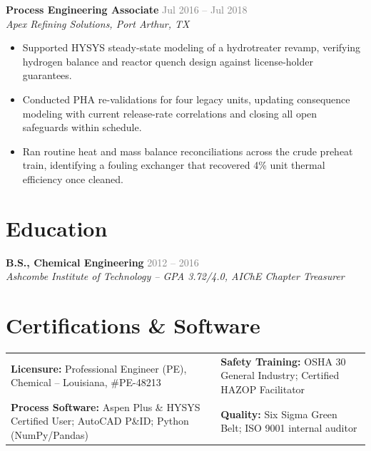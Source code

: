 \documentclass[10.5pt,letterpaper]{article}
\newcommand{\role}[3]{%
  \textbf{\color{primary}#1} \hfill \textcolor{graytext}{\small #2}\\
  \textit{\color{accent}\small #3}\par\vspace{2pt}
}
\newcommand{\edu}[3]{%
  \textbf{\color{primary}#1} \hfill \textcolor{graytext}{\small #2}\\
  \textit{\color{accent}\small #3}\par
}
\newcommand{\skillcat}[2]{%
  {\small\textbf{\color{primary}#1: }\color{graytext}#2}\par\vspace{3pt}
}
\begin{document}
\role{Process Engineering Associate}{Jul 2016 -- Jul 2018}{Apex Refining Solutions, Port Arthur, TX}
\begin{itemize}
  \item Supported HYSYS steady-state modeling of a hydrotreater revamp, verifying hydrogen
  balance and reactor quench design against license-holder guarantees.
  \item Conducted PHA re-validations for four legacy units, updating consequence modeling with
  current release-rate correlations and closing all open safeguards within schedule.
  \item Ran routine heat and mass balance reconciliations across the crude preheat train,
  identifying a fouling exchanger that recovered 4\% unit thermal efficiency once cleaned.
\end{itemize}

\section*{\textcolor{primary}{Education}}
\vspace{-11pt}
{\color{rulegray}\titlerule[0.9pt]}
\vspace{4pt}
\edu{B.S., Chemical Engineering}{2012 -- 2016}{Ashcombe Institute of Technology -- GPA 3.72/4.0, AIChE Chapter Treasurer}

\section*{\textcolor{primary}{Certifications \& Software}}
\vspace{-11pt}
{\color{rulegray}\titlerule[0.9pt]}
\vspace{4pt}
\begin{tabularx}{\linewidth}{@{}X X@{}}
\skillcat{Licensure}{Professional Engineer (PE), Chemical -- Louisiana, \#PE-48213} &
\skillcat{Safety Training}{OSHA 30 General Industry; Certified HAZOP Facilitator} \\
\skillcat{Process Software}{Aspen Plus \& HYSYS Certified User; AutoCAD P\&ID; Python (NumPy/Pandas)} &
\skillcat{Quality}{Six Sigma Green Belt; ISO 9001 internal auditor} \\
\end{tabularx}
\end{document}
